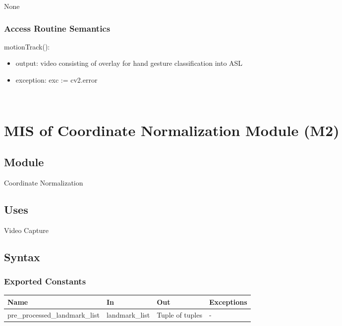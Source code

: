 \documentclass[12pt, titlepage]{article}
\begin{document}
None

\subsubsection{Access Routine Semantics}

\noindent motionTrack():
\begin{itemize}
\item output: video consisting of overlay for hand gesture classification into ASL\\
\item exception: exc := cv2.error\\
\end{itemize}

~\newpage

\section{MIS of Coordinate Normalization Module (M2)} \label{M2}

\subsection{Module}

Coordinate Normalization\\

\subsection{Uses}

Video Capture\\

\subsection{Syntax}

\subsubsection{Exported Constants}

\begin{center}
\begin{tabular}{p{5cm} p{4cm} p{4cm} p{2cm}}
\hline
\textbf{Name} & \textbf{In} & \textbf{Out} & \textbf{Exceptions} \\
\hline
pre\_processed\_landmark\_list & landmark\_list & Tuple of tuples & - \\
\hline
\end{tabular}
\end{center}
\end{document}
